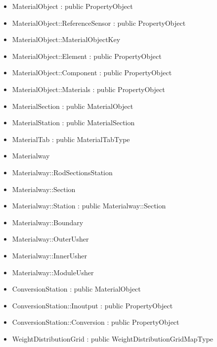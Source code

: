 \documentclass[12pt, a4paper]{article}
\begin{document}
\begin{itemize}

\item MaterialObject : public PropertyObject
\item MaterialObject::ReferenceSensor : public PropertyObject
\item MaterialObject::MaterialObjectKey
\item MaterialObject::Element : public PropertyObject
\item MaterialObject::Component : public PropertyObject
\item MaterialObject::Materials : public PropertyObject
\item MaterialSection : public MaterialObject
\item MaterialStation : public MaterialSection
\item MaterialTab : public MaterialTabType
\item Materialway
\item Materialway::RodSectionsStation
\item Materialway::Section
\item Materialway::Station : public Materialway::Section
\item Materialway::Boundary
\item Materialway::OuterUsher
\item Materialway::InnerUsher
\item Materialway::ModuleUsher
\item ConversionStation : public MaterialObject
\item ConversionStation::Inoutput : public PropertyObject
\item ConversionStation::Conversion : public PropertyObject
\item WeightDistributionGrid : public WeightDistributionGridMapType

\end{itemize}
\end{document}
